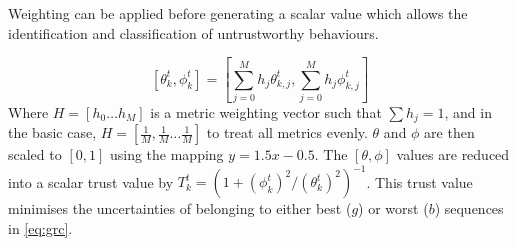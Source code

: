 Weighting can be applied before generating a scalar value which allows the identification and classification of untrustworthy behaviours.

%
\begin{equation}
  \label{eq:metric_weighting}
  [\theta_k^t, \phi_k^t] = \left[\sum_{j=0}^M h_j \theta_{k,j}^t,\sum_{j=0}^M h_j \phi_{k,j}^t \right]
\end{equation}
Where $H=[h_0\dots h_M]$ is a metric weighting vector such that $\sum h_j = 1$, and in the basic case, $H=[\frac{1}{M},\frac{1}{M}\dots\frac{1}{M}]$ to treat all metrics evenly.
$\theta$ and $\phi$ are then scaled to $[0,1]$ using the mapping $y = 1.5 x - 0.5$.
The $[\theta,\phi]$ values are reduced into a scalar trust value by $T_k^t = ({1+{(\phi_k^t)^2}/{(\theta_k^t)^2}})^{-1}$.
This trust value minimises the uncertainties of belonging to either best ($g$) or worst ($b$) sequences in \eqref{eq:grc}.

